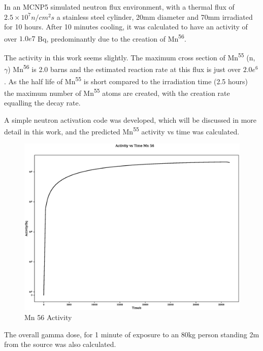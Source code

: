 In an MCNP5 simulated neutron flux environment, with a thermal flux of $2.5 \times 10^7 n/cm^2 s$ a stainless steel cylinder, 20mm diameter and 70mm irradiated for 10 hours\cite{radionuclides}.  After 10 minutes cooling, it was calculated to have an activity of over $1.0e7$ Bq, predominantly due to the creation of Mn\textsuperscript{56}.  

The activity in this work seems slightly.  The maximum cross section of Mn\textsuperscript{55} (n, $\gamma$) Mn\textsuperscript{56} is 2.0 barns and the estimated reaction rate at this flux is just over $2.0e^6$.  As the half life of Mn\textsuperscript{55} is short compared to the irradiation time (2.5 hours) the maximum number of Mn\textsuperscript{55} atoms are created, with the creation rate equalling the decay rate.

A simple neutron activation code was developed, which will be discussed in more detail in this work, and the predicted Mn\textsuperscript{55} activity vs time was calculated.

\begin{figure}
  \begin{center}
    \includegraphics[width=15.0cm]{chapters/background_radiation_effects_and_transport/neutron_plots/1/25_Mn_56_activity.eps}
    \caption{Mn 56 Activity}
    \label{fig:mn_56_activity}
  \end{center}
\end{figure}

The overall gamma dose, for 1 minute of exposure to an 80kg person standing 2m from the source was also calculated.

